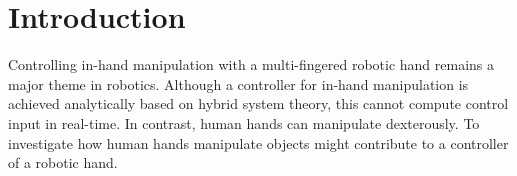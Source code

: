 \documentclass[letterpaper, 10 pt, conference]{IEEEtran}  %
\begin{document}
\begin{abstract}

\end{abstract}


\section{Introduction}

Controlling in-hand manipulation with a multi-fingered robotic hand remains a major theme in robotics. Although a controller for in-hand manipulation is achieved analytically based on hybrid system theory, this cannot compute control input in real-time\cite{yingjie2005mld}. In contrast, human hands can manipulate dexterously. To investigate how human hands manipulate objects might contribute to a controller of a robotic hand.
\end{document}

